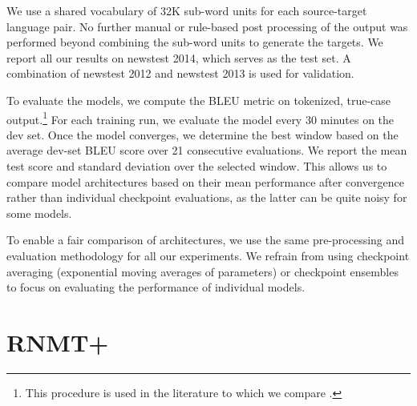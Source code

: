 \documentclass[11pt,a4paper]{article}
\begin{document}
We use a shared vocabulary of 32K sub-word units for each
source-target language pair. No further manual or rule-based post
processing of the output was performed beyond combining the sub-word
units to generate the targets.  We report all our results on newstest
2014, which serves as the test set. A combination of newstest 2012 and
newstest 2013 is used for validation.

To evaluate the models, we compute the BLEU metric on tokenized, true-case
output.\footnote{This procedure is used in the literature to which we compare
  \cite{DBLP:journals/corr/GehringAGYD17,DBLP:journals/corr/WuSCLNMKCGMKSJL16}.}
For each training run, we evaluate the
model every 30 minutes on the dev set. Once the model converges, we
determine the best window based on the average dev-set BLEU score over
21 consecutive evaluations.
We report the mean test score and standard
deviation over the selected window. This allows us to compare model
architectures based on their mean performance after convergence rather than
individual checkpoint evaluations, as the latter can be quite noisy for some models.

To enable a fair comparison of architectures, we use the same pre-processing and
evaluation methodology for all our experiments. We refrain from using checkpoint
averaging (exponential moving averages of parameters) \cite{junczys2016amu} or
checkpoint ensembles \cite{jean2015using,DBLP:journals/corr/abs-1710-03282}
to focus on evaluating the performance of individual models.



\section{RNMT+}
\label{sec:v2}
\end{document}
